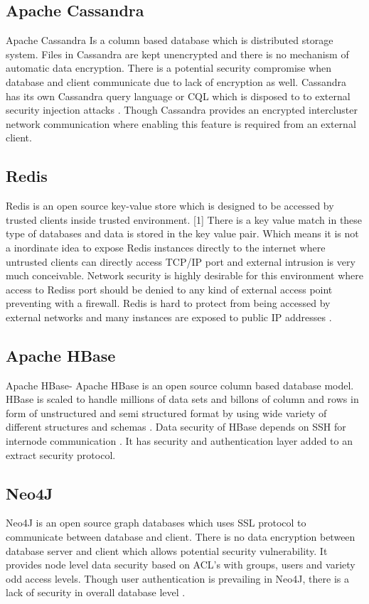 \subsection{Apache Cassandra}
Apache Cassandra Is a column based database which is distributed storage system. Files in Cassandra are kept unencrypted and there is no mechanism of automatic data encryption. There is a potential security compromise when database and client communicate due to lack of encryption as well.  Cassandra has its own Cassandra query language or CQL which is disposed to to external security injection attacks \cite{editor05}.  Though Cassandra provides an encrypted intercluster network communication where enabling this feature is required from an external client. 

\subsection{Redis}
Redis is an open source key-value store which is designed to be accessed by trusted clients inside trusted environment. [1] There is a key value match in these type of databases and data is stored in the key value pair. Which means it is not a inordinate idea to expose Redis instances directly to the internet where untrusted clients can directly access TCP/IP port and external intrusion is very much conceivable. Network security is highly desirable for this environment where access to Rediss port should be denied to any kind of external access point preventing with a firewall. Redis is hard to protect from being accessed by external networks and many instances are exposed to public IP addresses \cite{editor03}. 

\subsection{Apache HBase}
Apache HBase- Apache HBase is an open source column based database model. HBase is scaled to handle millions of data sets and billons of column and rows in form of unstructured and semi structured format by using wide variety of different structures and schemas \cite{editor07}. Data security of HBase depends on SSH for internode communication \cite{editor07}.  It has security and authentication layer added to an extract security protocol. 

\subsection{Neo4J}
Neo4J is an open source graph databases which uses SSL protocol to communicate between database and client. There is no data encryption between database server and client which allows potential security vulnerability. It provides node level data security based on ACL’s with groups, users and variety odd access levels. Though user authentication is prevailing in Neo4J, there is a lack of security in overall database level \cite{editor03}.

